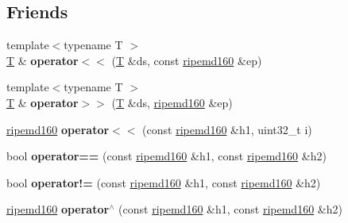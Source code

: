 \subsection*{Friends}
\begin{DoxyCompactItemize}
\item 
\mbox{\label{classfc_1_1ripemd160_a479f288a930a413335590b08ff8af0ec}} 
{\footnotesize template$<$typename T $>$ }\\\mbox{\hyperlink{struct_t}{T}} \& {\bfseries operator$<$$<$} (\mbox{\hyperlink{struct_t}{T}} \&ds, const \mbox{\hyperlink{classfc_1_1ripemd160}{ripemd160}} \&ep)
\item 
\mbox{\label{classfc_1_1ripemd160_a0c18ac57201eb89ec1b4c3527750f184}} 
{\footnotesize template$<$typename T $>$ }\\\mbox{\hyperlink{struct_t}{T}} \& {\bfseries operator$>$$>$} (\mbox{\hyperlink{struct_t}{T}} \&ds, \mbox{\hyperlink{classfc_1_1ripemd160}{ripemd160}} \&ep)
\item 
\mbox{\label{classfc_1_1ripemd160_a7faa73e7ef78c12cbe81588836dc0079}} 
\mbox{\hyperlink{classfc_1_1ripemd160}{ripemd160}} {\bfseries operator$<$$<$} (const \mbox{\hyperlink{classfc_1_1ripemd160}{ripemd160}} \&h1, uint32\+\_\+t i)
\item 
\mbox{\label{classfc_1_1ripemd160_a9ea7160188d70a1495c72fa44e7f29e2}} 
bool {\bfseries operator==} (const \mbox{\hyperlink{classfc_1_1ripemd160}{ripemd160}} \&h1, const \mbox{\hyperlink{classfc_1_1ripemd160}{ripemd160}} \&h2)
\item 
\mbox{\label{classfc_1_1ripemd160_a2cb9ea7e7765c6bee46e3ca686faa136}} 
bool {\bfseries operator!=} (const \mbox{\hyperlink{classfc_1_1ripemd160}{ripemd160}} \&h1, const \mbox{\hyperlink{classfc_1_1ripemd160}{ripemd160}} \&h2)
\item 
\mbox{\label{classfc_1_1ripemd160_a57e0a68fee04485bd3e833fdda26104b}} 
\mbox{\hyperlink{classfc_1_1ripemd160}{ripemd160}} {\bfseries operator$^\wedge$} (const \mbox{\hyperlink{classfc_1_1ripemd160}{ripemd160}} \&h1, const \mbox{\hyperlink{classfc_1_1ripemd160}{ripemd160}} \&h2)
\item 
\mbox{\label{classfc_1_1ripemd160_a3914f7a44533d04fefe88df4020042bc}} 

\end{DoxyCompactItemize}
